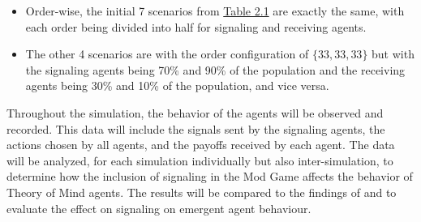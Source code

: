 \begin{itemize}
    \item Order-wise, the initial 7 scenarios from \hyperref[tab:reg-population-table]{Table 2.1} are exactly the same, with each order being divided into half for signaling and receiving agents.
    \item The other 4 scenarios are with the order configuration of $\{33,33,33\}$ but with the signaling agents being 70\% and 90\% of the population and the receiving agents being 30\% and 10\% of the population, and vice versa.
\end{itemize}


Throughout the simulation, the behavior of the agents will be observed and recorded. This data will include the signals sent by the signaling agents, the actions chosen by all agents, and the payoffs received by each agent. The data will be analyzed, for each simulation individually but also inter-simulation, to determine how the inclusion of signaling in the Mod Game affects the behavior of Theory of Mind agents. The results will be compared to the findings of \cite{de2013much} and \cite{veltman2019training} to evaluate the effect on signaling on emergent agent behaviour.